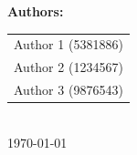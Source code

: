 \begin{titlepage}
    {\Large \textbf{\textcolor{tudelftdarkblue}{Authors:}}}\\[0.5cm]
    \begin{tabular}{c}
        \Large \textcolor{tudelftdarkblue}{Author 1 (5381886)} \\
        \Large \textcolor{tudelftdarkblue}{Author 2 (1234567)} \\
        \Large \textcolor{tudelftdarkblue}{Author 3 (9876543)} \\
    \end{tabular}\\[2cm]
    
    {\Large \textcolor{tudelftdarkblue}{\today}}
    
    \vfill
    \begin{center}
        
    \end{center}
\end{titlepage}

